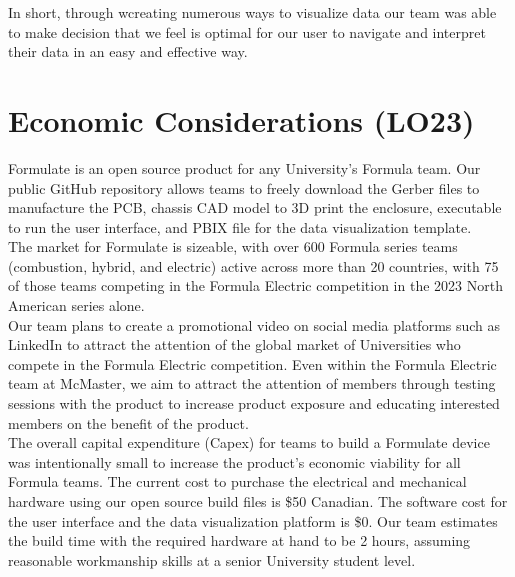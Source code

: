 \documentclass[12pt,titlepage]{article}
\begin{document}
In short, through wcreating numerous ways to visualize data our team was able to make decision that we feel is optimal for our user to navigate and interpret their data in an easy and effective way.


\section{Economic Considerations (LO23)}


Formulate is an open source product for any University's Formula team. Our public GitHub repository allows teams to freely download the Gerber files to manufacture the PCB, chassis CAD model to 3D print the enclosure, executable to run the user interface, and PBIX file for the data visualization template. \\

The market for Formulate is sizeable, with over 600 Formula series teams (combustion, hybrid, and electric) active across more than 20 countries, with 75 of those teams competing in the Formula Electric competition in the 2023 North American series alone. \\

Our team plans to create a promotional video on social media platforms such as LinkedIn to attract the attention of the global market of Universities who compete in the Formula Electric competition. Even within the Formula Electric team at McMaster, we aim to attract the attention of members through testing sessions with the product to increase product exposure and educating interested members on the benefit of the product. \\

The overall capital expenditure (Capex) for teams to build a Formulate device was intentionally small to increase the product's economic viability for all Formula teams. The current cost to purchase the electrical and mechanical hardware using our open source build files is \$50 Canadian. The software cost for the user interface and the data visualization platform is \$0. Our team estimates the build time with the required hardware at hand to be 2 hours, assuming reasonable workmanship skills at a senior University student level. \\
\end{document}

